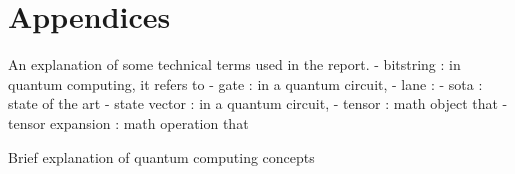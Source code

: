 \documentclass[12pt,oneside,a4paper]{article}
\begin{document}

\section{Appendices}
An explanation of some technical terms used in the report.
- bitstring : in quantum computing, it refers to
- gate : in a quantum circuit,
- lane :
- sota : state of the art
- state vector : in a quantum circuit,
- tensor : math object that
- tensor expansion : math operation that

Brief explanation of quantum computing concepts


\end{document}
